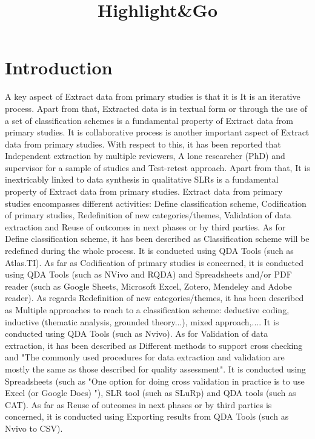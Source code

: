 \documentclass{article}
\title{Highlight&Go}
\author{}
\begin{document}
\maketitle
      

\section{Introduction}

A key aspect of Extract data from primary studies is that it is It is an iterative process. Apart from that, Extracted data is in textual form or through the use of a set of classification schemes is a fundamental property of Extract data from primary studies. It is collaborative process is another important aspect of Extract data from primary studies. With respect to this, it has been reported that Independent extraction by multiple reviewers, A lone researcher (PhD) and supervisor for a sample of studies and Test-retest approach. Apart from that, It is inextricably linked to data synthesis in qualitative SLRs is a fundamental property of Extract data from primary studies. Extract data from primary studies encompasses different activities: Define classification scheme, Codification of primary studies, Redefinition of new categories/themes, Validation of data extraction and Reuse of outcomes in next phases or by third parties. As for Define classification scheme, it has been described as Classification scheme will be redefined during the whole process. It is conducted using QDA Tools (such as Atlas.TI). As far as Codification of primary studies is concerned, it is conducted using QDA Tools (such as NVivo and RQDA) and Spreadsheets and/or PDF reader (such as Google Sheets, Microsoft Excel, Zotero, Mendeley and Adobe reader). As regards Redefinition of new categories/themes, it has been described as Multiple approaches to reach to a classification scheme: deductive coding, inductive (thematic analysis, grounded theory...), mixed approach,.... It is conducted using QDA Tools (such as Nvivo). As for Validation of data extraction, it has been described as Different methods to support cross checking and "The commonly used procedures for data extraction and validation are mostly the same as those described for quality assessment". It is conducted using Spreadsheets (such as "One option for doing cross validation in practice is to use Excel  (or  Google  Docs) "), SLR tool (such as SLuRp) and QDA tools (such as CAT). As far as Reuse of outcomes in next phases or by third parties is concerned, it is conducted using Exporting results from QDA Tools (such as Nvivo to CSV). 
    
\end{document}
